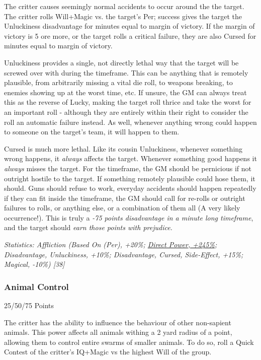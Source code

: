 \begin{multicols*}{3}
	The critter causes seemingly normal accidents to occur around the the target. The critter rolls Will+Magic vs. the target's Per; success gives the target the Unluckiness disadvantage for minutes equal to margin of victory. If the margin of victory is 5 ore more, or the target rolls a critical failure, they are also Cursed for minutes equal to margin of victory.
	
	Unluckiness provides a single, not directly lethal way that the target will be screwed over with during the timeframe. This can be anything that is remotely plausible, from arbitrarily missing a vital die roll, to weapons breaking, to enemies showing up at the worst time, etc. If unsure, the GM can always treat this as the reverse of Lucky, making the target roll thrice and take the worst for an important roll - although they are entirely within their right to consider the roll an automatic failure instead. As well, whenever anything wrong could happen to someone on the target's team, it will happen to them.
	
	Cursed is much more lethal. Like its cousin Unluckiness, whenever something wrong happens, it \textit{always} affects the target. Whenever something good happens it \textit{always} misses the target. For the timeframe, the GM should be pernicious if not outright hostile to the target. If something remotely plausible could hose them, it should. Guns should refuse to work, everyday accidents should happen repeatedly if they can fit inside the timeframe, the GM should call for re-rolls or outright failures to rolls, or anything else, or a combination of them all (A very likely occurrence!). This is truly a \textit{-75 points disadvantage in a minute long timeframe}, and the target should \textit{earn those points with prejudice.}
	
	\textcolor{OliveGreen}{\textit{Statistics: Affliction (Based On (Per), +20\%; \hyperref[cp_ct]{Direct Power, +245\%}; Disadvantage, Unluckiness, +10\%; Disadvantage, Cursed, Side-Effect, +15\%; Magical, -10\%) [38]}}
	
	
	\subsubsection{Animal Control}\label{animal_control}
	\begin{flushright}
		25/50/75 Points
	\end{flushright}
	
	The critter has the ability to influence the behaviour of other non-sapient animals. This power affects all animals withing a 2 yard radius of a point, allowing them to control entire swarms of smaller animals. To do so, roll a Quick Contest of the critter's IQ+Magic vs the highest Will of the group.
	

\end{multicols*}
